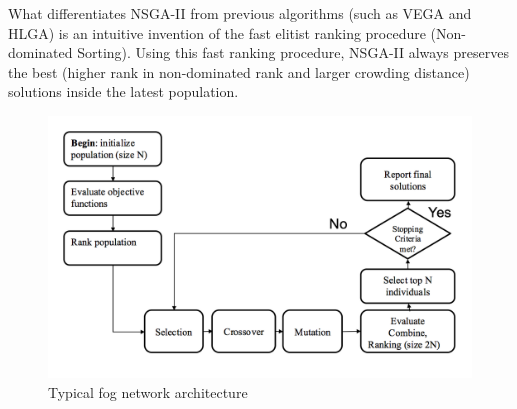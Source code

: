 \documentclass[10pt,journal,compsoc]{IEEEtran}
\begin{document}
What differentiates NSGA-II from previous algorithms (such as VEGA and HLGA) is an intuitive invention of the fast elitist ranking procedure (Non-dominated Sorting). Using this fast ranking procedure, NSGA-II always preserves the best (higher rank in non-dominated rank and larger crowding distance) solutions inside the latest population. 
\begin{figure}[ht]
\centerline{\includegraphics[width=\columnwidth]{nsgaphaseflowchart.png}}
\caption{Typical fog network architecture} 
\label{foggg}
\end{figure}


\end{document}
